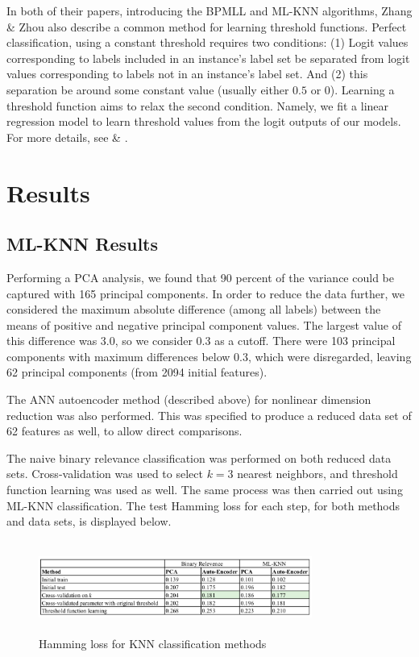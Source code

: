 \documentclass[11pt]{article}
\begin{document}
In both of their papers, introducing the BPMLL and ML-KNN algorithms, Zhang \& Zhou also describe a common method for learning threshold functions. Perfect classification, using a constant threshold requires two conditions: (1) Logit values corresponding to labels included in an instance's label set  be separated from logit values corresponding to labels not in an instance's label set. And (2) this separation be around some constant value (usually either $0.5$ or $0$). Learning a threshold function aims to relax the second condition. Namely, we fit a linear regression model to learn threshold values from the logit outputs of our models. For more details, see \autocite{bpmll} \& \autocite{ZhangMulti-labelLazy}. 
\section{Results}

\subsection{ML-KNN Results}

Performing a PCA analysis, we found that 90 percent of the variance could be captured with 165 principal components. In order to reduce the data further, we considered the maximum absolute difference (among all labels) between the means of positive and negative principal component values. The largest value of this difference was 3.0, so we consider 0.3 as a cutoff. There were 103 principal components with maximum differences below 0.3, which were disregarded, leaving 62 principal components (from 2094 initial features). 

The ANN autoencoder method (described above) for nonlinear dimension reduction was also performed. This was specified to produce a reduced data set of 62 features as well, to allow direct comparisons. 

The naive binary relevance classification was performed on both reduced data sets. Cross-validation was used to select $k=3$ nearest neighbors, and threshold function learning was used as well. The same process was then carried out using ML-KNN classification. The test Hamming loss for each step, for both methods and data sets, is displayed below. 

\begin{figure}[!htbp]
\centering 
        \includegraphics[width=0.8\textwidth,height=3.0cm]{KNN_summary.png}
\caption[Original image and post processed image]{Hamming loss for KNN classification methods}
\end{figure}
\end{document}
